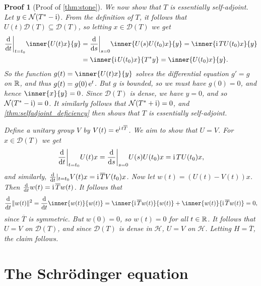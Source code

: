 \documentclass[article, a4paper, 11pt, oneside]{memoir}
\numberwithin{equation}{chapter}
\newcommand{\calH}{\mathcal{H}}
\newcommand{\dom}{\mathcal{D}}
\newcommand{\nullspace}{\mathcal{N}}
\theoremstyle{myexample}
\theoremstyle{myexample}
\theoremstyle{myexamplebreak}
\theoremstyle{myexamplebreak}
\theoremstyle{nonumberplain}
\theoremstyle{MyNonumberplain}
\newtheorem{proofof}{Proof}
\begin{document}
\begin{proofof}[Proof of \cref{thm:stone}]
    We now show that $T$ is essentially self-adjoint. Let $y \in \nullspace(T^* - \iu)$. From the definition of $T$, it follows that $U(t) \dom(T) \subseteq \dom(T)$, so letting $x \in \dom(T)$ we get
    \begin{align*}
        \frac{\dif}{\dif t} \bigg\rvert_{t = t_0} \inner{U(t)x}{y}
            &= \frac{\dif}{\dif s} \bigg\rvert_{s = 0} \inner{U(s)U(t_0)x}{y}
             = \inner{\iu T U(t_0)x}{y} \\
            &= \inner{\iu U(t_0)x}{T^*y}
             = \inner{U(t_0)x}{y}.
    \end{align*}
    So the function $g(t) = \inner{U(t)x}{y}$ solves the differential equation $g' = g$ on $\mathbb{R}$, and thus $g(t) = g(0) \operatorname{\mathrm{e}}^t$. But $g$ is bounded, so we must have $g(0) = 0$, and hence $\inner{x}{y} = 0$. Since $\dom(T)$ is dense, we have $y = 0$, and so $\nullspace(T^* - \iu) = 0$. It similarly follows that $\nullspace(T^* + \iu) = 0$, and \cref{thm:selfadjoint_deficiency} then shows that $T$ is essentially self-adjoint.
    
    Define a unitary group $V$ by $V(t) = \operatorname{\mathrm{e}}^{\operatorname{i} t \overline{T}}$. We aim to show that $U = V$. For $x \in \dom(T)$ we get
    \begin{equation*}
        \frac{\mathop{}\!\mathrm{d}}{\mathop{}\!\mathrm{d} t} \bigg\rvert_{t = t_0} U(t)x
            = \frac{\mathop{}\!\mathrm{d}}{\mathop{}\!\mathrm{d} s} \bigg\rvert_{s = 0} U(s)U(t_0)x
            = \operatorname{i} T U(t_0)x,
    \end{equation*}
    and similarly, $\frac{\mathop{}\!\mathrm{d}}{\mathop{}\!\mathrm{d} t} \rvert_{t = t_0} V(t)x = \operatorname{i} \overline{T} V(t_0)x$. Now let $w(t) = (U(t) - V(t))x$. Then $\frac{\mathop{}\!\mathrm{d}}{\mathop{}\!\mathrm{d} t} w(t) = \operatorname{i} \overline{T} w(t)$. It follows that
    \begin{equation*}
        \frac{\dif}{\dif t} \norm{w(t)}^2
            = \frac{\dif}{\dif t} \inner{w(t)}{w(t)}
            = \inner{\iu \overline{T} w(t)}{w(t)} + \inner{w(t)}{\iu \overline{T} w(t)}
            = 0,
    \end{equation*}
    since $\overline{T}$ is symmetric. But $w(0) = 0$, so $w(t) = 0$ for all $t \in \mathbb{R}$. It follows that $U = V$ on $\dom(T)$, and since $\dom(T)$ is dense in $\calH$, $U = V$ on $\calH$. Letting $H = \overline{T}$, the claim follows.
\end{proofof}



\section{The Schrödinger equation}
\end{document}

